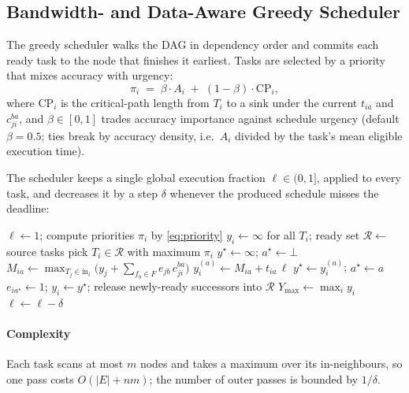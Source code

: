 \documentclass[conference]{IEEEtran}
\begin{document}
\subsection{Bandwidth- and Data-Aware Greedy Scheduler}
\label{sec:greedy}

The greedy scheduler walks the DAG in dependency order and commits each ready task to the node that finishes it earliest. Tasks are selected by a priority that mixes accuracy with urgency:
\begin{equation}
\pi_i \;=\; \beta\cdot A_i \;+\; (1-\beta)\cdot \mathrm{CP}_i,
\label{eq:priority}
\end{equation}
where $\mathrm{CP}_i$ is the critical-path length from $T_i$ to a sink under the current $t_{ia}$ and $c_{ji}^{ba}$, and $\beta\in[0,1]$ trades accuracy importance against schedule urgency (default $\beta=0.5$; ties break by accuracy density, i.e.\ $A_i$ divided by the task's mean eligible execution time).

The scheduler keeps a single global execution fraction $\ell\in(0,1]$, applied to every task, and decreases it by a step $\delta$ whenever the produced schedule misses the deadline:

\begin{algorithm}[t]
\caption{Bandwidth/Data-Aware Greedy DAG Scheduler}
\label{alg:greedy}
\begin{algorithmic}[1]
\STATE $\ell\leftarrow 1$; compute priorities $\pi_i$ by \eqref{eq:priority}
\REPEAT
  \STATE $y_i\leftarrow\infty$ for all $T_i$; ready set $\mathcal{R}\leftarrow$ source tasks
    \STATE pick $T_i\in\mathcal{R}$ with maximum $\pi_i$
    \STATE $y^{\star}\leftarrow\infty$; $a^{\star}\leftarrow\bot$
        \STATE $M_{ia}\leftarrow \max_{T_j\in \mathrm{in}_i}\bigl(y_j+\sum_{f_b\in F} e_{jb}\, c_{ji}^{ba}\bigr)$
        \STATE $y_i^{(a)}\leftarrow M_{ia}+t_{ia}\,\ell$
            \STATE $y^{\star}\leftarrow y_i^{(a)}$; $a^{\star}\leftarrow a$
        \ENDIF
    \ENDFOR
    \STATE $e_{ia^{\star}}\leftarrow 1$; $y_i\leftarrow y^{\star}$; release newly-ready successors into $\mathcal{R}$
  \ENDWHILE
  \STATE $Y_{\max}\leftarrow \max_i y_i$
      \STATE $\ell\leftarrow\ell-\delta$ 
  \ENDIF
{}
\end{algorithmic}
\end{algorithm}

\paragraph*{Complexity} Each task scans at most $m$ nodes and takes a maximum over its in-neighbours, so one pass costs $O(|E|+nm)$; the number of outer passes is bounded by $1/\delta$.
\end{document}
